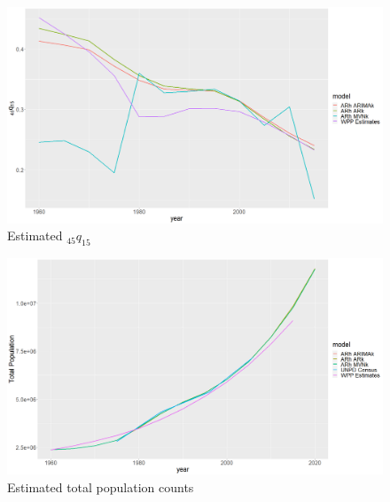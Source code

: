 \documentclass[12pt,a4paper]{article}
\begin{document}
\newpage
\begin{figure}[H]
\includegraphics[width = \linewidth]{Burkina Faso/5/45q15.jpg}
\caption{Estimated $_{45}q_{15}$}
\end{figure}
\begin{figure}[H]
\includegraphics[width = \linewidth]{Burkina Faso/5/total pop.jpg}
\caption{Estimated total population counts}
\end{figure}
\end{document}
